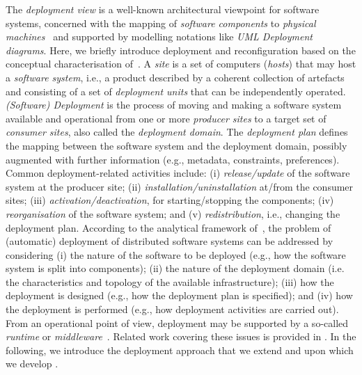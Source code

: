 \documentclass[conference]{IEEEtran}
\begin{document}
The \emph{deployment view} is a well-known architectural viewpoint for software systems,
concerned with the mapping of \emph{software components} to \emph{physical machines}~\cite{DBLP:journals/software/Kruchten95}
 and supported by modelling notations like \emph{UML Deployment diagrams}.
%
Here, we briefly introduce deployment and reconfiguration based on the conceptual characterisation of~\cite{DBLP:journals/jss/ArcangeliBL15,carzaniga1998characterization}.
%
A \emph{site} is a set of computers (\emph{hosts}) that may host a \emph{software system}, i.e., a product described by a coherent collection of artefacts and consisting of a set of \emph{deployment units} that can be independently operated.
%
\emph{(Software) Deployment} is the process of moving and making a software system available and operational from one or more \emph{producer sites} to a target set of \emph{consumer sites}, also called the \emph{deployment domain}.
%
The \emph{deployment plan} defines 
 the mapping between the software system
 and the deployment domain,
 possibly augmented with further information (e.g., metadata, constraints, preferences).
%
Common deployment-related activities include:
(i) \emph{release/update} of the software system at the producer site;
(ii) \emph{installation/uninstallation} at/from the consumer sites;
(iii) \emph{activation/deactivation}, for starting/stopping the components;
(iv) \emph{reorganisation} of the software system;
and (v) \emph{redistribution}, i.e., changing the deployment plan.
%
According to the analytical framework of~\cite{DBLP:journals/jss/ArcangeliBL15},
  the problem of (automatic) deployment of distributed software systems can be addressed by considering
 (i) the nature of the software to be deployed (e.g., how the software system is split into components);
 (ii) the nature of the deployment domain (i.e. the characteristics and topology of the available infrastructure);
 (iii) how the deployment is designed (e.g., how the deployment plan is specified);
 and 
 (iv) how the deployment is performed (e.g., how deployment activities are carried out).
%
From an operational point of view,
 deployment may be supported by a so-called \emph{runtime} or \emph{middleware}~\cite{DBLP:journals/cacm/GazisK22}.
%
Related work covering these issues is provided in .
%
In the following, we introduce the deployment approach 
  that we extend and upon which we develop \ourframework{}.
\end{document}
